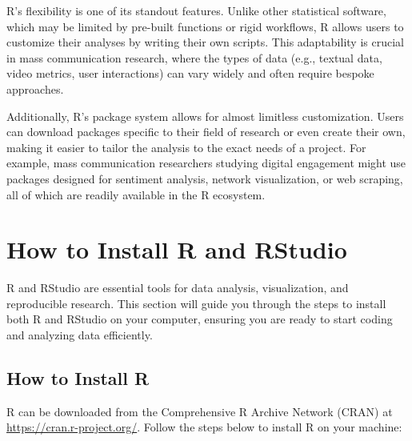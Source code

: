 \documentclass[
]{book}
\begin{document}
R's flexibility is one of its standout features. Unlike other statistical software, which may be limited by pre-built functions or rigid workflows, R allows users to customize their analyses by writing their own scripts. This adaptability is crucial in mass communication research, where the types of data (e.g., textual data, video metrics, user interactions) can vary widely and often require bespoke approaches.

Additionally, R's package system allows for almost limitless customization. Users can download packages specific to their field of research or even create their own, making it easier to tailor the analysis to the exact needs of a project. For example, mass communication researchers studying digital engagement might use packages designed for sentiment analysis, network visualization, or web scraping, all of which are readily available in the R ecosystem.

\section{How to Install R and RStudio}\label{how-to-install-r-and-rstudio}

R and RStudio are essential tools for data analysis, visualization, and reproducible research. This section will guide you through the steps to install both R and RStudio on your computer, ensuring you are ready to start coding and analyzing data efficiently.

\subsection*{How to Install R}\label{how-to-install-r}

R can be downloaded from the Comprehensive R Archive Network (CRAN) at \url{https://cran.r-project.org/}. Follow the steps below to install R on your machine:
\end{document}
